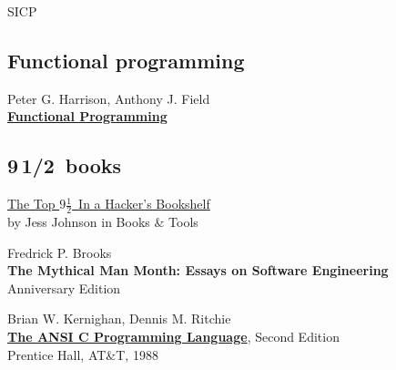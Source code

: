 \begin{thebibliography}{9}
 SICP

\subsection*{Functional programming}

 Peter G. Harrison, Anthony J. Field\\
\textbf{\href{http://www.amazon.com/Functional-Programming-International-Computer-Science/dp/0201192497}{Functional Programming}}

\subsection*{9\,1/2\ books}

\href{http://grokcode.com/11/the-top-9-in-a-hackers-bookshelf/}{The Top
$9\frac{1}{2}$\ In a Hacker’s Bookshelf}\\
by Jess Johnson	in Books \& Tools

 Fredrick P. Brooks\\
\textbf{The Mythical Man Month: Essays on Software Engineering}\\
Anniversary Edition

 Brian W. Kernighan, Dennis M. Ritchie\\
\textbf{\href{https://hassanolity.files.wordpress.com/2013/11/the_c_programming_language_2.pdf}{The ANSI C Programming Language}}, Second Edition\\
Prentice Hall, AT\&T, 1988 

\end{thebibliography}